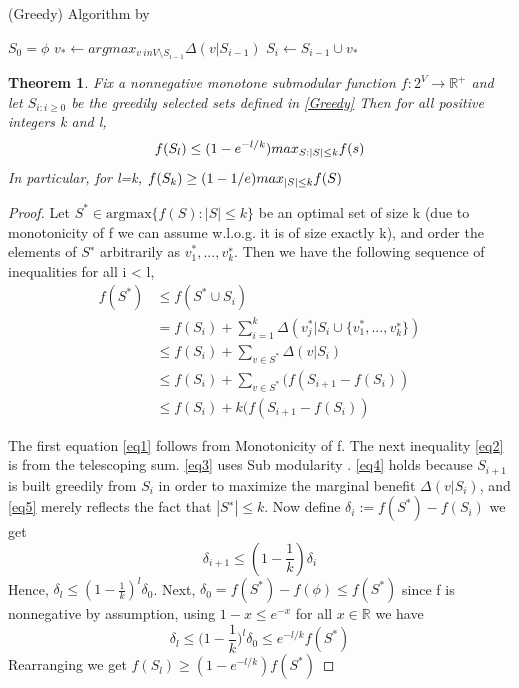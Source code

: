 \documentclass[a4paper,twoside]{iiththesis}
\newtheorem{theorem}{Theorem}
\theoremstyle{definition}
\theoremstyle{definition}
\theoremstyle{remark}
\begin{document}
\begin{algorithm}
\caption{(Greedy) Algorithm by \cite{nemhauser}}
\label{Greedy}
\begin{algorithmic}[1]
\State $S_0= {\phi}$ 
\State $ v_{*} \leftarrow argmax_{v\ in V\setminus S_{i−1}} \Delta (v|S_{i-1})$
\State $S_i \leftarrow S_{i-1} \cup {{v_*}}$
\EndFor
\end{algorithmic}

\end{algorithm}
\theoremstyle{definition}
\begin{theorem}
 Fix a nonnegative monotone submodular function
$f : 2^V \rightarrow \mathbb{R}^+$ and let ${S_{i:i\geq0}}$
be the greedily selected sets defined in \ref{Greedy}
Then for all positive integers  k and l, 
\begin{equation}
f(S_l) \leq (1 - e^{-l/k})\space max_{S:|S|\leq k} f(s)
\end{equation}
In particular, for l=k, $f(S_k) \geq (1- 1/e) \space max_{|S|\leq k} f(S)$
\end{theorem}
\begin{proof}
 Let $S^* \in \text{argmax} \{f(S) : |S| \leq k\}$  be an optimal set of size k (due to monotonicity of f we can assume w.l.o.g. it is of size exactly k), and order the elements of $S^∗$ arbitrarily as ${v^{*}_{1}, . . . , v^{∗}_k}$. Then we have the following sequence of inequalities for all i < l,
 \begin{align}
 f(S^*) &\leq f(S^* \cup S_i) \label{eq1}\\
 		&= f(S_i) + \sum_{i=1}^k \Delta(v_j^* | S_i \cup \{{v^{*}_{1}, . . . , v^{∗}_k}\}) \label{eq2} \\
        &\leq f(S_i) + \sum_{v\in S^*} \Delta(v | S_i) \label{eq3}\\
        &\leq f(S_i) + \sum_{v\in S^*}  (f(S_{i+1} - f(S_i)) \label{eq4}\\
        &\leq f(S_i) + k(f(S_{i+1} - f(S_i)) \label{eq5}
 \end{align}


The first equation \ref{eq1} follows from Monotonicity of f. The next inequality \ref{eq2} is from the telescoping sum. \ref{eq3} uses Sub modularity . \ref{eq4}  holds because $S_{i+1}$ is built greedily from $S_i$ in order to maximize the marginal benefit $\Delta(v | S_i)$, and \ref{eq5} merely reflects the fact that $|S^∗| \leq k$. Now define $\delta_i := f(S^*) - f(S_i)$ we get 
\begin{equation}
	\delta_{i+1} \leq (1 - \frac{1}{k}) \delta_i
\end{equation}
Hence, $\delta_l \leq (1 - \frac{1}{k}) ^ l \delta_0$. Next, $\delta_0 = f(S^*) - f(\phi) \leq f(S^*)$ since f is nonnegative by assumption, using $1-x \leq e^{-x}$  for all $x \in \mathbb{R}$ we have 
\begin{equation}
\delta_l \leq \Big(1 - \frac{1}{k}\Big)^l \delta_0 \leq e^{-l/k} f(S^*) 
\end{equation}
Rearranging we get $f(S_l) \geq (1 - e^{-l/k})f(S^*)$
\end{proof}
\end{document}
